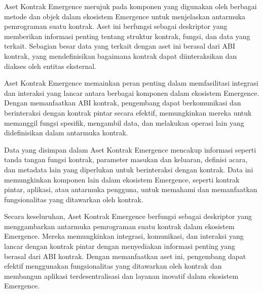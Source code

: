 Aset Kontrak Emergence merujuk pada komponen yang digunakan oleh berbagai metode dan objek dalam ekosistem Emergence untuk menjelaskan antarmuka pemrograman suatu kontrak. Aset ini berfungsi sebagai deskriptor yang memberikan informasi penting tentang struktur kontrak, fungsi, dan data yang terkait. Sebagian besar data yang terkait dengan aset ini berasal dari ABI kontrak, yang mendefinisikan bagaimana kontrak dapat diinteraksikan dan diakses oleh entitas eksternal.

Aset Kontrak Emergence memainkan peran penting dalam memfasilitasi integrasi dan interaksi yang lancar antara berbagai komponen dalam ekosistem Emergence. Dengan memanfaatkan ABI kontrak, pengembang dapat berkomunikasi dan berinteraksi dengan kontrak pintar secara efektif, memungkinkan mereka untuk memanggil fungsi spesifik, mengambil data, dan melakukan operasi lain yang didefinisikan dalam antarmuka kontrak.

Data yang disimpan dalam Aset Kontrak Emergence mencakup informasi seperti tanda tangan fungsi kontrak, parameter masukan dan keluaran, definisi acara, dan metadata lain yang diperlukan untuk berinteraksi dengan kontrak. Data ini memungkinkan komponen lain dalam ekosistem Emergence, seperti kontrak pintar, aplikasi, atau antarmuka pengguna, untuk memahami dan memanfaatkan fungsionalitas yang ditawarkan oleh kontrak.

Secara keseluruhan, Aset Kontrak Emergence berfungsi sebagai deskriptor yang menggambarkan antarmuka pemrograman suatu kontrak dalam ekosistem Emergence. Mereka memungkinkan integrasi, komunikasi, dan interaksi yang lancar dengan kontrak pintar dengan menyediakan informasi penting yang berasal dari ABI kontrak. Dengan memanfaatkan aset ini, pengembang dapat efektif menggunakan fungsionalitas yang ditawarkan oleh kontrak dan membangun aplikasi terdesentralisasi dan layanan inovatif dalam ekosistem Emergence.

